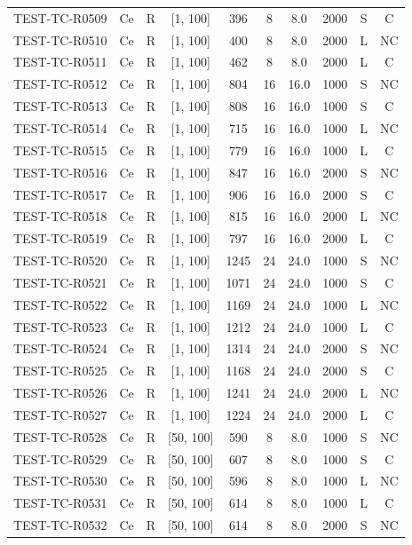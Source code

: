 \begin{longtable}{lccccccccc}
TEST-TC-R0509 & Ce & R & [1, 100] & 396 & 8 & 8.0 & 2000 & S & C \\
TEST-TC-R0510 & Ce & R & [1, 100] & 400 & 8 & 8.0 & 2000 & L & NC \\
TEST-TC-R0511 & Ce & R & [1, 100] & 462 & 8 & 8.0 & 2000 & L & C \\
TEST-TC-R0512 & Ce & R & [1, 100] & 804 & 16 & 16.0 & 1000 & S & NC \\
TEST-TC-R0513 & Ce & R & [1, 100] & 808 & 16 & 16.0 & 1000 & S & C \\
TEST-TC-R0514 & Ce & R & [1, 100] & 715 & 16 & 16.0 & 1000 & L & NC \\
TEST-TC-R0515 & Ce & R & [1, 100] & 779 & 16 & 16.0 & 1000 & L & C \\
TEST-TC-R0516 & Ce & R & [1, 100] & 847 & 16 & 16.0 & 2000 & S & NC \\
TEST-TC-R0517 & Ce & R & [1, 100] & 906 & 16 & 16.0 & 2000 & S & C \\
TEST-TC-R0518 & Ce & R & [1, 100] & 815 & 16 & 16.0 & 2000 & L & NC \\
TEST-TC-R0519 & Ce & R & [1, 100] & 797 & 16 & 16.0 & 2000 & L & C \\
TEST-TC-R0520 & Ce & R & [1, 100] & 1245 & 24 & 24.0 & 1000 & S & NC \\
TEST-TC-R0521 & Ce & R & [1, 100] & 1071 & 24 & 24.0 & 1000 & S & C \\
TEST-TC-R0522 & Ce & R & [1, 100] & 1169 & 24 & 24.0 & 1000 & L & NC \\
TEST-TC-R0523 & Ce & R & [1, 100] & 1212 & 24 & 24.0 & 1000 & L & C \\
TEST-TC-R0524 & Ce & R & [1, 100] & 1314 & 24 & 24.0 & 2000 & S & NC \\
TEST-TC-R0525 & Ce & R & [1, 100] & 1168 & 24 & 24.0 & 2000 & S & C \\
TEST-TC-R0526 & Ce & R & [1, 100] & 1241 & 24 & 24.0 & 2000 & L & NC \\
TEST-TC-R0527 & Ce & R & [1, 100] & 1224 & 24 & 24.0 & 2000 & L & C \\
TEST-TC-R0528 & Ce & R & [50, 100] & 590 & 8 & 8.0 & 1000 & S & NC \\
TEST-TC-R0529 & Ce & R & [50, 100] & 607 & 8 & 8.0 & 1000 & S & C \\
TEST-TC-R0530 & Ce & R & [50, 100] & 596 & 8 & 8.0 & 1000 & L & NC \\
TEST-TC-R0531 & Ce & R & [50, 100] & 614 & 8 & 8.0 & 1000 & L & C \\
TEST-TC-R0532 & Ce & R & [50, 100] & 614 & 8 & 8.0 & 2000 & S & NC \\

\end{longtable}
